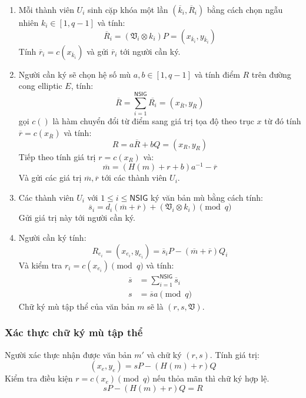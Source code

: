 \begin{enumerate}[label=(\arabic*)]
	\item Mỗi thành viên $U_i$ sinh cặp khóa một lần $(\overline{k}_i,\overline{R}_i)$ bằng cách chọn ngẫu nhiên $k_i \in [1,q-1]$ và tính: \[ \overline{R}_i = (\mathfrak{V}_i \otimes k_i)P = (x_{\overline{k}_i},y_{\overline{k}_i}) \]
	Tính $\overline{r}_i = c(x_{\overline{k}_i})$ và gửi $\overline{r}_i$ tới người cần ký.
	\item Người cần ký sẽ chọn hệ số mù $a,b \in [1,q-1]$ và tính điểm $R$ trên đường cong elliptic $E$, tính: \[ \overline{R} = \sum_{i=1}^{\mathsf{NSIG}} \overline{R_i} = (x_{\overline{R}},y_{\overline{R}}) \] 
	gọi $c()$ là hàm chuyển đổi từ điểm sang giá trị tọa độ theo trục $x$ từ đó tính $\overline{r} =  c(x_{\overline{R}})$ và tính:
	\[ R = a\overline{R} + bQ  = (x_R,y_R)\]
	Tiếp theo tính giá trị $r = c(x_R)$ và:
	\begin{equation}
	\overline{m} = (H(m) + r + b)a^{-1}  - \overline{r}
	\end{equation}
	Và gửi các giá trị $\overline{m},\overline{r}$ tới các thành viên $U_i$.
	\item Các thành viên $U_i$ với $1 \le i \le \mathsf{NSIG}$ ký văn bản mù bằng cách tính:
	\begin{equation}
	\overline{s}_i = d_i(\overline{m} + \overline{r}) + (\mathfrak{V}_i \otimes k_i) \pmod q \label{pt.si}
	\end{equation}
	Gửi giá trị này tới người cần ký.
	\item Người cần ký tính:
	\begin{equation}
	R_{e_i} = (x_{e_i}, y_{e_i}) = \overline{s}_iP - (\overline{m} + \overline{r})Q_i 
	\end{equation}
	Và kiểm tra $r_i = c(x_{e_i}) \pmod q$ và tính: 
	\begin{align}
		\overline{s} &= \sum_{i=1}^{\mathsf{NSIG}} \overline{s}_i \label{pt.ssa} \\ 
		s &= \overline{s}a \pmod q \label{pt.sa}
	\end{align}
	Chữ ký mù tập thể của văn bản $m$ sẽ là $(r,s,\mathfrak{V})$.
\end{enumerate}

\subsubsection{Xác thực chữ ký mù tập thể}

Người xác thực nhận được văn bản $m'$ và chữ ký $(r,s)$. Tính giá trị:
\begin{equation}
(x_e,y_e) = sP -(H(m) + r)Q 
\end{equation}
Kiểm tra điều kiện $r = c(x_e) \pmod q$ nếu thỏa mãn thì chữ ký hợp lệ.
\[ sP -(H(m) + r)Q = R\]

